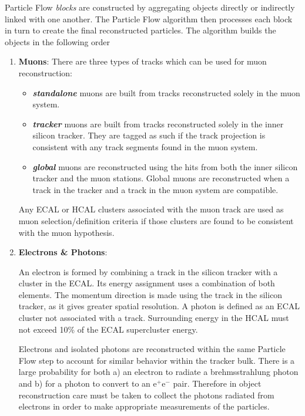 Particle Flow \textit{blocks} are constructed by aggregating objects directly or indirectly linked with one another. The Particle Flow algorithm then processes each block in turn to create the final reconstructed particles. The algorithm builds the objects in the following order

\begin{enumerate}
\item \textbf{Muons}:
There are three types of tracks which can be used for muon reconstruction:
\begin{itemize}
\item
\textit{\textbf{standalone}} muons are built from tracks reconstructed solely in the muon system.
\item
\textit{\textbf{tracker}} muons are built from tracks reconstructed solely in the inner silicon tracker. They are tagged as such if the track projection is consistent with any track segments found in the muon system.
\item
\textit{\textbf{global}} muons are reconstructed using the hits from both the inner silicon tracker and the muon stations. Global muons are reconstructed when a track in the tracker and a track in the muon system are compatible.
\end{itemize}

Any ECAL or HCAL clusters associated with the muon track are used as muon selection/definition criteria if those clusters are found to be consistent with the muon hypothesis.

\item \textbf{Electrons \& Photons}:

An electron is formed by combining a track in the silicon tracker with a cluster in the ECAL. Its energy assignment uses a combination of both elements. The momentum direction is made using the track in the silicon tracker, as it gives greater spatial resolution.  A photon is defined as an ECAL cluster not associated with a track. Surrounding energy in the HCAL must not exceed 10\% of the ECAL supercluster energy.

Electrons and isolated photons are reconstructed within the same Particle Flow step to account for similar behavior within the tracker bulk. There is a large probability for both a) an electron to radiate a brehmsstrahlung photon and b) for a photon to convert to an e$^{+}$e$^{-}$ pair. Therefore in object reconstruction care must be taken to collect the photons radiated from electrons in order to make appropriate measurements of the particles.


\end{enumerate}
